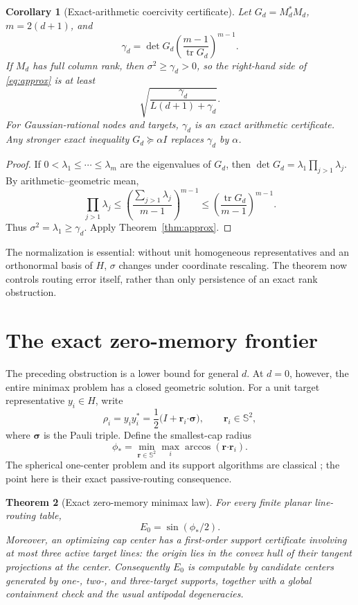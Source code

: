 \documentclass[11pt]{article}
\newtheorem{theorem}{Theorem}[section]
\newtheorem{corollary}[theorem]{Corollary}
\theoremstyle{definition}\newtheorem{definition}[theorem]{Definition}\newtheorem{example}[theorem]{Example}
\theoremstyle{remark}\newtheorem{remark}[theorem]{Remark}\newtheorem{limitation}[theorem]{Limitation}
\begin{document}
\begin{corollary}[Exact-arithmetic coercivity certificate]\label{cor:coercive}
Let $G_d=M_d^*M_d$, $m=2(d+1)$, and
\[
 \gamma_d=\det G_d\left(\frac{m-1}{\operatorname{tr}G_d}\right)^{m-1}.
\]
If $M_d$ has full column rank, then $\sigma^2\ge\gamma_d>0$, so the right-hand
side of \eqref{eq:approx} is at least
\[
                       \sqrt{\frac{\gamma_d}{L(d+1)+\gamma_d}}.
\]
For Gaussian-rational nodes and targets, $\gamma_d$ is an exact arithmetic
certificate.  Any stronger exact inequality $G_d\succeq\alpha I$ replaces
$\gamma_d$ by $\alpha$.
\end{corollary}

\begin{proof}
If $0<\lambda_1\le\cdots\le\lambda_m$ are the eigenvalues of $G_d$, then
$\det G_d=\lambda_1\prod_{j>1}\lambda_j$.  By arithmetic--geometric mean,
\[
 \prod_{j>1}\lambda_j
 \le\left(\frac{\sum_{j>1}\lambda_j}{m-1}\right)^{m-1}
 \le\left(\frac{\operatorname{tr}G_d}{m-1}\right)^{m-1}.
\]
Thus
$\sigma^2=\lambda_1\ge\gamma_d$.  Apply Theorem~\ref{thm:approx}.
\end{proof}

The normalization is essential: without unit homogeneous representatives and
an orthonormal basis of $H$, $\sigma$ changes under coordinate rescaling.  The
theorem now controls routing error itself, rather than only persistence of an
exact rank obstruction.

\section{The exact zero-memory frontier}

The preceding obstruction is a lower bound for general $d$.  At $d=0$, however,
the entire minimax problem has a closed geometric solution.  For a unit target
representative $y_i\in H$, write
\[
 \rho_i=y_i y_i^*=\frac12\bigl(I+\mathbf r_i\boldsymbol\cdot\boldsymbol\sigma\bigr),
 \qquad \mathbf r_i\in\mathbb S^2,
\]
where $\boldsymbol\sigma$ is the Pauli triple.  Define the smallest-cap radius
\begin{equation}\label{eq:cap-radius}
 \phi_*=\min_{\mathbf r\in\mathbb S^2}\max_i
              \arccos(\mathbf r\boldsymbol\cdot\mathbf r_i).
\end{equation}
The spherical one-center problem and its support algorithms are classical
\cite{Flemming2026}; the point here is their exact passive-routing consequence.

\begin{theorem}[Exact zero-memory minimax law]\label{thm:zero-memory}
For every finite planar line-routing table,
\begin{equation}\label{eq:zero-memory}
                         \boxed{E_0=\sin(\phi_*/2)}.
\end{equation}
Moreover, an optimizing cap center has a first-order support certificate
involving at most three active target lines: the origin lies in the convex hull
of their tangent projections at the center.  Consequently $E_0$ is computable
by candidate centers generated by one-, two-, and three-target supports,
together with a global containment check and the usual antipodal degeneracies.
\end{theorem}
\end{document}
